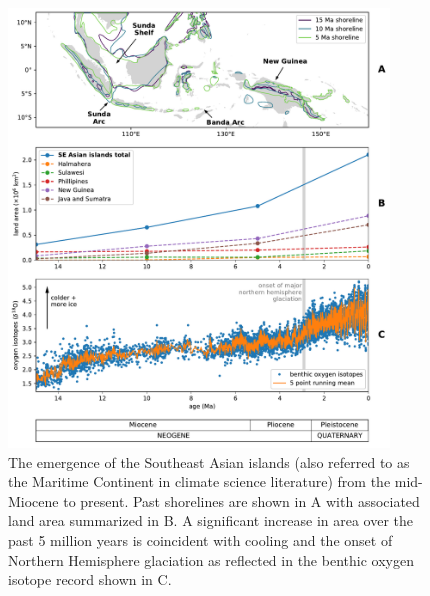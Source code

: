 \documentclass[11pt,letterpaper]{article}
\begin{document}
\begin{figure}[h!]
    \centering
    \includegraphics[width=0.9\textwidth]{Figures/shoreline_growth.pdf}
    \caption{The emergence of the Southeast Asian islands (also referred to as the Maritime Continent in climate science literature) from the mid-Miocene to present. Past shorelines are shown in A with associated land area summarized in B. A significant increase in area over the past 5 million years is coincident with cooling and the onset of Northern Hemisphere glaciation as reflected in the benthic oxygen isotope record \cite{Zachos2008a} shown in C.}
    \label{fig:shoreline_growth}
\end{figure}
\end{document}
